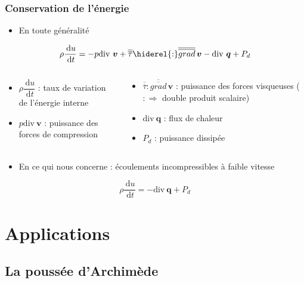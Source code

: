 \documentclass[%
	final, %
	 10pt, %
 	compress, %
hyperref={bookmarks=true}	
]{beamer}
\renewcommand{\v}[1]{\ensuremath{\bm{#1}}} %
\newcommand{\ddr}[1]{\, \mathrm{d} #1}
\newcommand{\gradd}[1]{\overline{\overline{grad}} \, \bm{#1}}
\newcommand{\diver}[1]{\textrm{div} \ {#1}}
\begin{document}
\begin{frame}\frametitle{Conservation de l'énergie}
\begin{itemize}
\item En toute généralité
\end{itemize}
\begin{dmath*}
\rho \dfrac{\ddr  u}{\ddr t} = -p \diver{\v{v}} +
\overline{\overline{\tau}} \hiderel{:} \gradd {v} - \diver{\v{q}} + P_{d} 
\end{dmath*}
{\small
\begin{columns}
\begin{column}{5cm}
\begin{itemize}
\item $\rho \dfrac{\ddr  u}{\ddr t}$ : taux de variation de l'énergie interne
\item $p \diver{\v{v}}$ : puissance des forces de compression
\end{itemize}
\end{column}
\begin{column}{5cm}
\begin{itemize}
\item $\overline{\overline{\tau}} : \gradd {v}$ : puissance des forces
  visqueuses ($:  \Rightarrow$ double produit scalaire)
\item $\diver{\v{q}}$ : flux de chaleur 
\item $P_{d}$ : puissance dissipée
\end{itemize}
\end{column}
\end{columns}}
\begin{itemize}
\item En ce qui nous concerne : écoulements incompressibles à faible vitesse
\end{itemize}
\begin{dmath*}
\rho \dfrac{\ddr  u}{\ddr t} =  - \diver{\v{q}} + P_{d} 
\end{dmath*}
\end{frame}


\section{Applications}
\label{sec:applications}


\subsection{La poussée d'Archimède}
\label{sec:la-pouss-darch}
\end{document}
